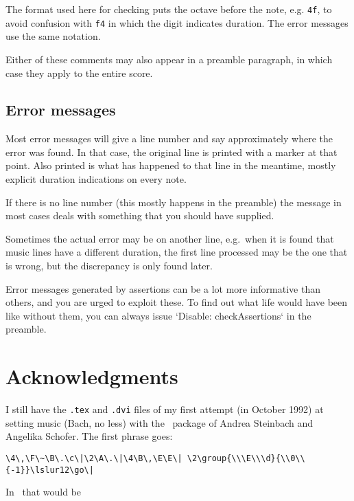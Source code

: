 \documentclass[11pt]{article}
\begin{document}
The format used here for  checking puts the octave
 before the note, e.g. \verb`4f`, to avoid confusion with \verb`f4`
in which the digit indicates duration. The error messages
use the same notation.

Either of these comments may also appear in a preamble paragraph,
in which case they apply to the entire score. 

\subsection{Error messages}

Most error messages will give a line number and say approximately
where the error was found. In that case, the original line is printed
with a marker at that point. Also printed is what has happened to that
line in the meantime, mostly explicit duration indications on every
note.

If there is no line number (this mostly happens in the preamble)
the message in most cases deals with something that you should have
supplied.

Sometimes the actual error may be on another line, e.g.\ when it is 
found that music lines have a different duration, the first line 
processed may be the one that is wrong, but the discrepancy is only 
found later.

Error messages generated by assertions can be a lot more informative
than others, and you are urged to exploit these. To find out what life
would have been like without them, you can always issue 
`Disable: checkAssertions` in the preamble.

\section{Acknowledgments} 


I still have the 
\texttt{.tex} and \texttt{.dvi} files of my first attempt (in October 1992)
at setting music (Bach, no less) with the \mutex\ package of Andrea Steinbach 
and Angelika Schofer.  The first phrase goes: 
\begin{verbatim} 
\4\,\F\~\B\.\c\|\2\A\.\|\4\B\,\E\E\| \2\group{\\\E\\\d}{\\0\\{-1}}\lslur12\go\| 
\end{verbatim} 
In \MTx\ that would be                        
\end{document}
